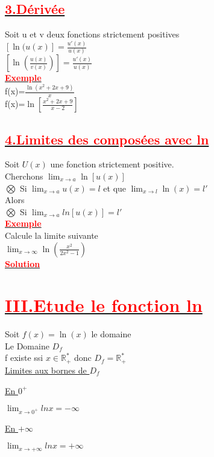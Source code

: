 \documentclass[12pt,a4paper]{article}
\begin{document}
\subsection*{\underline{\textbf{\textcolor{red}{3.Dérivée}}}}
Soit u et v deux fonctions strictement positives \\
$[\ln(u(x)]=\frac{u'(x)}{u(x)}$\\
$[\ln(\frac{u(x)}{v(x)})]=\frac{u'(x)}{u(x)}$\\
\underline{\textbf{\textcolor{red}{Exemple}}}\\
f(x)=$\frac{\ln(x^{2}+2x+9)}{x}$\\
f(x)=$\ln[\frac{x^{2}+2x+9}{x-2}]$
\subsection*{\underline{\textbf{\textcolor{red}{4.Limites des composées avec ln}}}}
Soit $U(x)$ une fonction strictement positive.\\
Cherchons $\lim_{{x \to a}} \ln[u(x)]$\\
$\bigotimes$ Si $\lim_{{x \to a}} u(x)=l$ et que $\lim_{{x \to l}} \ln(x)=l'$\\
Alors \\
$\bigotimes$ Si $\lim_{{x \to a}} ln[u(x)]=l'$\\
\underline{\textbf{\textcolor{red}{Exemple}}}\\
Calcule la limite suivante\\
$\lim_{{x \to \infty}} \ln(\frac{x^{2}}{2x^{2}-1})$\\
\underline{\textbf{\textcolor{red}{Solution}}}\\

\section*{\underline{\textbf{\textcolor{red}{III.Etude le fonction ln}}}}
Soit $f(x)=\ln(x)$ le domaine \\
Le Domaine $D_{f}$ \\
f existe ssi $x\in \mathbb{R^{*}_{+}}$ donc $D_{f}=\mathbb{R^{*}_{+}}$\\

\underline{Limites aux bornes de $D_{f}$}

\underline{En $0^{+}$}

$\lim_{{x \to 0^{+}}} lnx=-\infty$

\underline{En $+\infty$}

$\lim_{{x \to +\infty}} lnx=+\infty$
\end{document}
